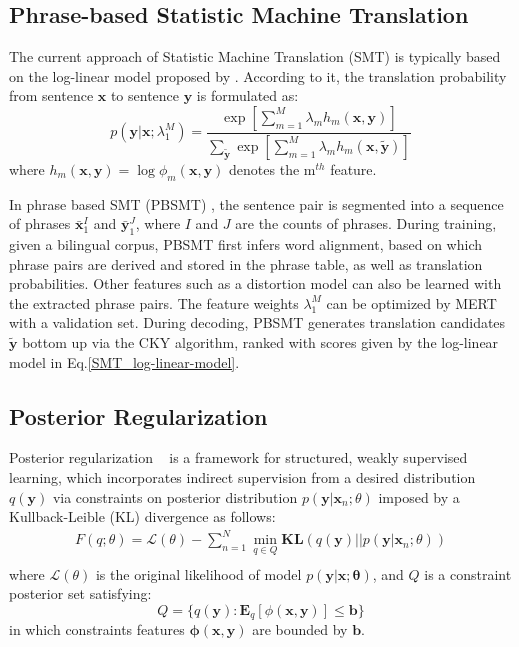 \documentclass[letterpaper]{article} \usepackage{aaai19}  \usepackage{times}  \usepackage{helvet}  \usepackage{courier}  \usepackage{url}  \usepackage{graphicx}  \usepackage{amsmath}
\newcommand{\newref}[1]{Eq.\eqref{#1}}
\newcommand{\bx}{\mathbf{x}}
\newcommand{\by}{\mathbf{y}}
\begin{document}
\subsection{Phrase-based Statistic Machine Translation}
\label{PBSMT}


The current approach of Statistic Machine Translation (SMT) is typically based on the log-linear model proposed by \citeauthor{och2002discriminative} . According to it, the translation probability from sentence $\bx$ to sentence $\by$ is formulated as:
\begin{equation}
p(\by|\bx;\lambda_1^M)
=\frac{\exp{[\sum_{m=1}^M\lambda_{m}h_{m}(\bx,\by)]}}
{\sum_{\mathbf{\tilde{\by}}}\exp{[\sum_{m=1}^M\lambda_{m}h_{m}(\bx,\tilde{\by})]}}
\label{SMT_log-linear-model}
\end{equation}
where $h_{m}(\bx,\by)=\log \phi_m(\bx,\by)$ denotes the m$^{th}$ feature.


In phrase based SMT (PBSMT) \cite{koehn2003statistical}, the sentence pair is segmented into a sequence of phrases $\bar{\bx}_1^I$ and $\bar{\by}_1^J$, where $I$ and $J$ are the counts of phrases. During training, given a bilingual corpus, PBSMT first infers word alignment, based on which phrase pairs are derived and stored in the phrase table, as well as translation probabilities. 
Other features such as a distortion model 
can also be learned with the extracted phrase pairs.
The feature weights $\lambda_1^M$ can be optimized by MERT \cite{och2003minimum} with a validation set. 
During decoding, PBSMT generates translation candidates $\tilde{\by}$ bottom up via the CKY algorithm, ranked with scores given by the log-linear model in \newref{SMT_log-linear-model}. 

\subsection{Posterior Regularization}
Posterior regularization ~\cite{ganchev2010posterior} is a framework for structured, weakly supervised learning, which incorporates indirect supervision from a desired distribution $q(\by)$ via constraints on posterior distribution $p(\by|\bx_{n};\theta)$ imposed by a Kullback-Leible (KL) divergence as follows:
\begin{equation}
\begin{aligned}
F(q;\theta) = \mathcal{L}(\theta)-\sum_{n=1}^{N}\min_{q \in Q}\mathbf{KL}(q(\by)||p(\by|\bx_{n};\theta)) \\
\end{aligned}\label{PR_Likelihood}
\end{equation}
where $\mathcal{L}(\theta)$ is the original likelihood of model $p(\by|\bx;\mathbf{\theta})$, and $Q$ is a constraint posterior set satisfying:
\begin{equation}
Q = \{q(\by) : \mathbf{E}_{q}[\phi(\bx,\by)]\leq \mathbf{b}\}
\label{Q_set}
\end{equation}
in which constraints features $\mathbf{\phi}(\bx,\by)$ are bounded by $\mathbf{b}$.
\end{document}
